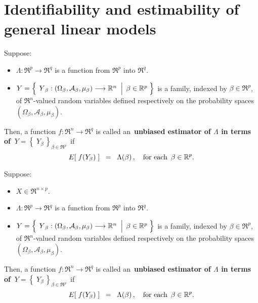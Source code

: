 

\section{Identifiability and estimability of general linear models}
\setcounter{theorem}{0}
\setcounter{equation}{0}

\renewcommand{\theenumi}{\roman{enumi}}
\renewcommand{\labelenumi}{\textnormal{(\theenumi)}$\;\;$}


\begin{definition}
\mbox{}\vskip 0.1cm\noindent
Suppose:
\begin{itemize}
\item
	$\Lambda : \Re^{p} \longrightarrow \Re^{q}$ is a function from $\Re^{p}$ into $\Re^{q}$.
\item
	$Y = \left\{\;
		\left.
		\overset{{\color{white}.}}{Y}_{\beta} : (\Omega_{\beta},\mathcal{A}_{\beta},\mu_{\beta}) \longrightarrow \Re^{n}
		\;\;\right\vert\;
		\beta \in \Re^{p}
		\;\right\}$
	is a family, indexed by $\beta \in \Re^{p}$,
	of $\Re^{n}$-valued random variables defined respectively on the
	probability spaces $(\Omega_{\beta},\mathcal{A}_{\beta},\mu_{\beta})$.
\end{itemize}
Then,
a function $f : \Re^{n} \longrightarrow \Re^{q}$ is called an
\,{\color{red}\textbf{unbiased estimator of $\Lambda$ in terms of \,$Y = \left\{\;Y_{\beta}\,\right\}_{\beta\in\Re^{p}}$}}\,
if
\begin{equation*}
E\!\left[\;f(Y_{\beta})\;\right] \;\; =\;\; \Lambda(\beta)\,,
\quad
\textnormal{for each \,$\beta \in \Re^{p}$}.
\end{equation*}
\end{definition}

\begin{definition}
\mbox{}\vskip 0.1cm\noindent
Suppose:
\begin{itemize}
\item
	$X \in \Re^{n \times p}$.
\item
	$\Lambda : \Re^{p} \longrightarrow \Re^{q}$ is a function from $\Re^{p}$ into $\Re^{q}$.
\item
	$Y = \left\{\;
		\left.
		\overset{{\color{white}.}}{Y}_{\beta} : (\Omega_{\beta},\mathcal{A}_{\beta},\mu_{\beta}) \longrightarrow \Re^{n}
		\;\;\right\vert\;
		\beta \in \Re^{p}
		\;\right\}$
	is a family, indexed by $\beta \in \Re^{p}$,
	of $\Re^{n}$-valued random variables defined respectively on the
	probability spaces $(\Omega_{\beta},\mathcal{A}_{\beta},\mu_{\beta})$.
\end{itemize}
Then,
a function $f : \Re^{n} \longrightarrow \Re^{q}$ is called an
\,{\color{red}\textbf{unbiased estimator of $\Lambda$ in terms of \,$Y = \left\{\;Y_{\beta}\,\right\}_{\beta\in\Re^{p}}$}}\,
if
\begin{equation*}
E\!\left[\;f(Y_{\beta})\;\right] \;\; =\;\; \Lambda(\beta)\,,
\quad
\textnormal{for each \,$\beta \in \Re^{p}$}.
\end{equation*}
\end{definition}

